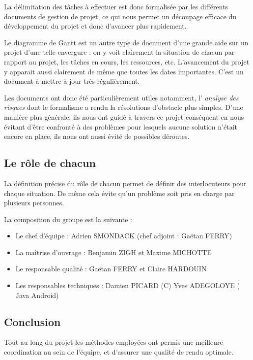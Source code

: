     La délimitation des tâches à effectuer est donc formalisée par les
    différents documents de gestion de projet, ce qui nous permet un découpage
    efficace du développement du projet et donc d'avancer plus rapidement.
  
    Le diagramme de Gantt est un autre type de document d'une grande aide sur un
    projet d'une telle envergure : on y voit clairement la situation de chacun
    par rapport au projet, les tâches en cours, les ressources, etc.
    L'avancement du projet y apparait aussi clairement de même que toutes les
    dates importantes. C'est un document à mettre à jour très régulièrement.
  
    Les documents ont donc été particulièrement utiles notamment, l'\emph{
    analyse des risques} dont le formalisme a rendu la résolutions d'obstacle
    plus simples. D'une manière plus générale, ils nous ont guidé à travers ce
    projet conséquent en nous évitant d'être confronté à des problèmes pour
    lesquels aucune solution n'était encore en place, ils nous ont aussi évité
    de possibles déroutes.
  
  \subsection{Le rôle de chacun}
  
    La définition précise du rôle de chacun permet de définir des interlocuteurs
    pour chaque situation. De même cela évite qu'un problème soit pris en charge
    par plusieurs personnes.
  
    La composition du groupe est la suivante :
    \begin{itemize}
      \item Le chef d'équipe : Adrien SMONDACK (chef adjoint : Gaëtan FERRY)
      \item La maîtrise d'ouvrage : Benjamin ZIGH et Maxime MICHOTTE
      \item Le responsable qualité : Gaëtan FERRY et Claire HARDOUIN
      \item Les responsables techniques : Damien PICARD (C) Yves ADEGOLOYE (
      Java Android)
    \end{itemize}
  
  
  \subsection{Conclusion}
  
    Tout au long du projet les méthodes employées ont permis une meilleure
    coordination au sein de l'équipe, et d'assurer une qualité de rendu optimale.
  
